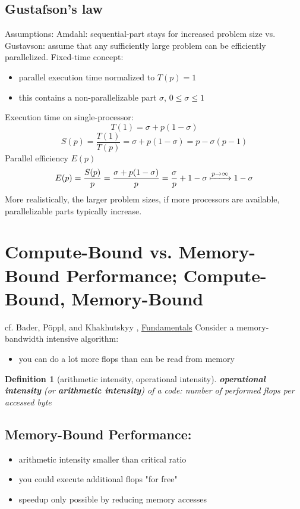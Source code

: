 \documentclass[10pt]{amsart}
\newtheorem{definition}{Definition}
\begin{document}
\begin{multicols*}{2}
\subsection{Gustafson's law}  
Assumptions: Amdahl: sequential-part stays for increased problem size vs.  
Gustavson: assume that any sufficiently large problem can be efficiently parallelized.  
Fixed-time concept:
\begin{itemize}
	\item parallel execution time normalized to $T(p)=1$
	\item this contains a non-parallelizable part $\sigma$, $0\leq \sigma \leq 1$
\end{itemize}
Execution time on single-processor:
\[
T(1) = \sigma + p(1-\sigma)
\]
\[
S(p) = \frac{T(1)}{T(p)} = \sigma + p(1-\sigma) = p-\sigma(p-1)
\]
Parallel efficiency $E(p)$
\[
E(p) = \frac{S(p)}{p} = \frac{ \sigma + p(1-\sigma) }{p} = \frac{\sigma}{p} + 1-\sigma \xmapsto{ p \to \infty} 1-\sigma
\]
More realistically, the larger problem sizes, if more processors are available, parallelizable parts typically increase.  
\section{Compute-Bound vs. Memory-Bound Performance; Compute-Bound, Memory-Bound}
cf. Bader, P\"{o}ppl, and Khakhutskyy \cite{BaPK2016}, \href{https://www5.in.tum.de/lehre/vorlesungen/hpc/WS16/fundamentals.pdf}{Fundamentals}
Consider a memory-bandwidth intensive algorithm: 
\begin{itemize}
	\item you can do a lot more flops than can be read from memory
\end{itemize}
\begin{definition}[arithmetic intensity, operational intensity]
	\textbf{operational intensity} (or \textbf{arithmetic intensity}) of a code: number of performed flops per accessed byte
\end{definition}
\subsection{Memory-Bound Performance:}
\begin{itemize}
	\item arithmetic intensity smaller than critical ratio
	\item you could execute additional flops "for free"
	\item speedup only possible by reducing memory accesses
\end{itemize}

\end{multicols*}
\end{document}
